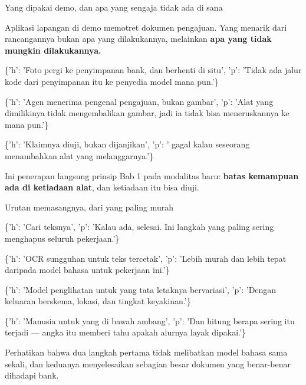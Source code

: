 \documentclass[aspectratio=169,11pt,t]{beamer}
\begin{document}
\begin{frame}[shrink=25]{Yang dipakai demo, dan apa yang sengaja tidak ada di sana}
{\fontsize{9.4}{12.6}\selectfont\color{fg2}Aplikasi lapangan di demo memotret dokumen pengajuan. Yang menarik dari rancangannya bukan apa yang dilakukannya, melainkan \textbf{apa yang tidak mungkin dilakukannya.}\par}\vskip 4pt
\begin{isteps}
\item \{'h': 'Foto pergi ke penyimpanan bank, dan berhenti di situ', 'p': 'Tidak ada jalur kode dari penyimpanan itu ke penyedia model mana pun.'\}
\item \{'h': 'Agen menerima pengenal pengajuan, bukan gambar', 'p': 'Alat yang dimilikinya tidak mengembalikan gambar, jadi ia tidak bisa meneruskannya ke mana pun.'\}
\item \{'h': 'Klaimnya diuji, bukan dijanjikan', 'p': ' gagal kalau seseorang menambahkan alat yang melanggarnya.'\}
\end{isteps}
\begin{iband}[signal]
Ini penerapan langsung prinsip Bab 1 pada modalitas baru: \textbf{batas kemampuan ada di ketiadaan alat}, dan ketiadaan itu bisa diuji.
\end{iband}
\end{frame}

\begin{frame}[shrink=25]{Urutan memasangnya, dari yang paling murah}
\begin{isteps}
\item \{'h': 'Cari teksnya', 'p': 'Kalau ada, selesai. Ini langkah yang paling sering menghapus seluruh pekerjaan.'\}
\item \{'h': 'OCR sungguhan untuk teks tercetak', 'p': 'Lebih murah dan lebih tepat daripada model bahasa untuk pekerjaan ini.'\}
\item \{'h': 'Model penglihatan untuk yang tata letaknya bervariasi', 'p': 'Dengan keluaran berskema, lokasi, dan tingkat keyakinan.'\}
\item \{'h': 'Manusia untuk yang di bawah ambang', 'p': 'Dan hitung berapa sering itu terjadi --- angka itu memberi tahu apakah alurnya layak dipakai.'\}
\end{isteps}
\begin{iband}[signal]
Perhatikan bahwa dua langkah pertama tidak melibatkan model bahasa sama sekali, dan keduanya menyelesaikan sebagian besar dokumen yang benar-benar dihadapi bank.
\end{iband}
\end{frame}
\end{document}
